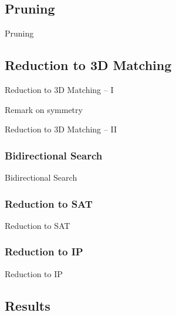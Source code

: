 \documentclass[t,10pt,
mathserif,xcolor=dvipsnames]{beamer}
\begin{document}
\subsection{Pruning}

\begin{myframe}{Pruning}

\end{myframe}

\subsection{Reduction to 3D Matching}

\begin{myframe}{Reduction to 3D Matching -- I}

Remark on symmetry
  
\end{myframe}

\begin{myframe}{Reduction to 3D Matching -- II}

\end{myframe}

\subsubsection{Bidirectional Search}

\begin{myframe}{Bidirectional Search}

\end{myframe}

\subsubsection{Reduction to SAT}

\begin{myframe}{Reduction to SAT}

\end{myframe}

\subsubsection{Reduction to IP}

\begin{myframe}{Reduction to IP}

\end{myframe}

\subsection{Results}
\end{document}
